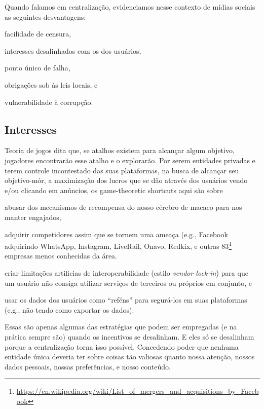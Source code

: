 Quando falamos em centralização, evidenciamos nesse contexto de mídias sociais as seguintes desvantagens:
\begin{enumerate*}[label=(\arabic*)]
    \item facilidade de censura,
    \item interesses desalinhados com os dos usuários,
    \item ponto único de falha,
    \item obrigações sob às leis locais, e
    \item vulnerabilidade à corrupção.
\end{enumerate*}

\subsection{Interesses}

Teoria de jogos dita que, se atalhos existem para alcançar algum objetivo, jogadores encontrarão esse atalho e o explorarão.
Por serem entidades privadas e terem controle incontestado das suas plataformas, na busca de alcançar seu objetivo-mór, a maximização dos lucros que se dão através dos usuários vendo e/ou clicando em anúncios, os game-theoretic shortcuts aqui são sobre
\begin{enumerate*}[label=(\arabic*)]
    \item abusar dos mecanismos de recompensa do nosso cérebro de macaco para nos manter engajados,
    \item adquirir competidores assim que se tornem uma ameaça (e.g., Facebook adquirindo WhatsApp, Instagram, LiveRail, Onavo, Redkix, e outras 83\footnote{\url{https://en.wikipedia.org/wiki/List_of_mergers_and_acquisitions_by_Facebook}} empresas menos conhecidas da área.
    \item criar limitações artificias de interoperabilidade (estilo \textit{vendor lock-in}) para que um usuário não consiga utilizar serviços de terceiros ou próprios em conjunto, e
    \item usar os dados dos usuários como ``reféns'' para segurá-los em suas plataformas (e.g., não tendo como exportar os dados).
\end{enumerate*}
Essas são apenas algumas das estratégias que podem ser empregadas (e na prática sempre são) quando os incentivos se desalinham.
E eles só se desalinham porque a centralização torna isso possível.
Concedendo poder que nenhuma entidade única deveria ter sobre coisas tão valiosas quanto nossa atenção, nossos dados pessoais, nossas preferências, e nosso conteúdo.

